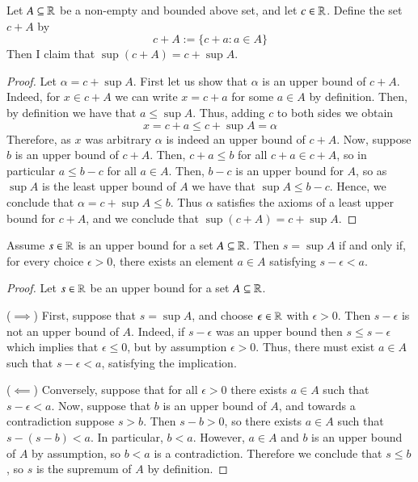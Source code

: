 \documentclass[12pt, a4paper, oneside, openright, titlepage]{book}
\begin{document}
\begin{eg}
    Let $A \subseteq \mathbb R$ be a non-empty and bounded above set, and let $c \in \mathbb R$. Define the set $c+A$ by $$c+A:=\{c+a:a \in A\}$$ Then I claim that $\sup(c+A) = c+\sup A$.
    \begin{proof}
        Let $\alpha = c+\sup A$. First let us show that $\alpha$ is an upper bound of $c+A$. Indeed, for $x \in c+A$ we can write $x = c+a$ for some $a \in A$ by definition. Then, by definition we have that $a \leq \sup A$. Thus, adding $c$ to both sides we obtain $$x = c+a \leq c+\sup A = \alpha$$
        Therefore, as $x$ was arbitrary $\alpha$ is indeed an upper bound of $c+A$. Now, suppose $b$ is an upper bound of $c+A$. Then, $c+a \leq b$ for all $c+a \in c+ A$, so in particular $a \leq b - c$ for all $a \in A$. Then, $b-c$ is an upper bound for $A$, so as $\sup A$ is the least upper bound of $A$ we have that $\sup A \leq b-c$. Hence, we conclude that $\alpha = c+\sup A \leq b$. Thus $\alpha$ satisfies the axioms of a least upper bound for $c+A$, and we conclude that $\sup(c+A) = c+\sup A$.
    \end{proof}
\end{eg}


\begin{lem}
    Assume $s \in \mathbb R$ is an upper bound for a set $A \subseteq \mathbb R$. Then $s = \sup A$ if and only if, for every choice $\epsilon > 0$, there exists an element $a \in A$ satisfying $s-\epsilon < a$.
\end{lem}
\begin{proof}
    Let $s \in \mathbb R$ be an upper bound for a set $A \subseteq \mathbb R$. 

    ($\implies$) First, suppose that $s = \sup A$, and choose $\epsilon \in \mathbb R$ with $\epsilon > 0$. Then $s-\epsilon$ is not an upper bound of $A$. Indeed, if $s-\epsilon$ was an upper bound then $s \leq s - \epsilon$ which implies that $\epsilon \leq 0$, but by assumption $\epsilon > 0$. Thus, there must exist $a \in A$ such that $s - \epsilon < a$, satisfying the implication.

    ($\impliedby$) Conversely, suppose that for all $\epsilon > 0$ there exists $a \in A$ such that $s - \epsilon < a$. Now, suppose that $b$ is an upper bound of $A$, and towards a contradiction suppose $s > b$. Then $s - b > 0$, so there exists $a \in A$ such that $s - (s-b) < a$. In particular, $b < a$. However, $a \in A$ and $b$ is an upper bound of $A$ by assumption, so $b < a$ is a contradiction. Therefore we conclude that $s \leq b$, so $s$ is the supremum of $A$ by definition.
\end{proof}
\end{document}
